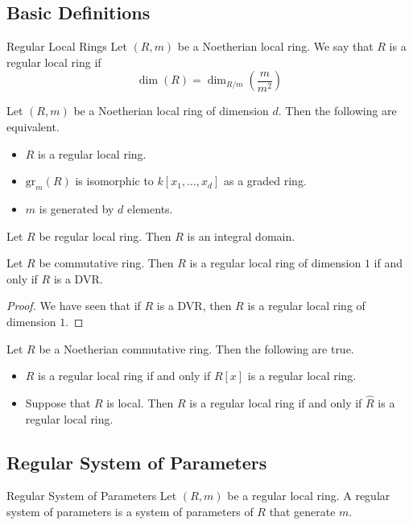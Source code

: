 \documentclass[a4paper]{article}
\begin{document}
\subsection{Basic Definitions}
\begin{defn}{Regular Local Rings}{} Let $(R,m)$ be a Noetherian local ring. We say that $R$ is a regular local ring if $$\dim(R)=\dim_{R/m}\left(\frac{m}{m^2}\right)$$
\end{defn}

\begin{prp}{}{} Let $(R,m)$ be a Noetherian local ring of dimension $d$. Then the following are equivalent. 
\begin{itemize}
\item $R$ is a regular local ring. 
\item $\text{gr}_m(R)$ is isomorphic to $k[x_1,\dots,x_d]$ as a graded ring. 
\item $m$ is generated by $d$ elements. 
\end{itemize}
\end{prp}

\begin{lmm}{}{} Let $R$ be regular local ring. Then $R$ is an integral domain. 
\end{lmm}

\begin{lmm}{}{} Let $R$ be commutative ring. Then $R$ is a regular local ring of dimension $1$ if and only if $R$ is a DVR. \tcbline
\begin{proof}
We have seen that if $R$ is a DVR, then $R$ is a regular local ring of dimension $1$. 
\end{proof}
\end{lmm}

\begin{lmm}{}{} Let $R$ be a Noetherian commutative ring. Then the following are true. 
\begin{itemize}
\item $R$ is a regular local ring if and only if $R[x]$ is a regular local ring. 
\item Suppose that $R$ is local. Then $R$ is a regular local ring if and only if $\widehat{R}$ is a regular local ring. 
\end{itemize}
\end{lmm}

\subsection{Regular System of Parameters}
\begin{defn}{Regular System of Parameters}{} Let $(R,m)$ be a regular local ring. A regular system of parameters is a system of parameters of $R$ that generate $m$. 
\end{defn}
\end{document}
